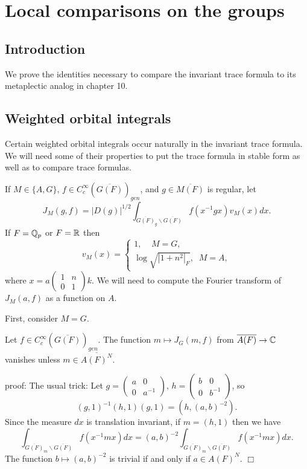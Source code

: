 
\chapter{Local comparisons on the groups}

\section{Introduction}
We prove the identities necessary to compare the
invariant trace formula to its metaplectic analog in chapter 10.

\section{Weighted orbital integrals}

Certain weighted orbital integrals occur naturally in the invariant trace
formula. We will need some of their properties to put the trace formula in
stable form as well as to compare trace formulas.  

If $M\in \{A,G\}$, $f\in C_c^\infty (\overline{G(F)})_{gen}$, and $g\in 
\overline{M(F)}$ is regular, let
\[
J_M(g,f)=|D(g)|^{1/2}
\int_{\overline{G(F)}_g\backslash \overline{G(F)}}
f(x^{-1}gx)v_M(x)dx.
\]
If $F={\Bbb{Q}}_p$ or $F={\Bbb{R}}$ then
\[
v_M(x)=\left\{ 
\begin{array}{c}
1,\;\;\;\;M=G, \\ 
\log \sqrt{|1+n^2|_F},\;\;M=A,
\end{array}
\right. 
\]
where $x=a\left( 
\begin{array}{cc}
1 & n \\ 
0 & 1
\end{array}
\right) k$. We will need to compute the Fourier transform of $J_M(a,f)$ as a
function on $A$.

First, consider $M=G$.

\begin{lemma}
Let $f\in C_c^\infty (\overline{G(F)})_{gen}$. The function $m\longmapsto
J_G(m,f)$ from $\overline{A(F)}\rightarrow {\Bbb C}$ vanishes unless $m\in 
\overline{A(F)^N}$.
\end{lemma}

proof: The usual trick: Let $g=\left( 
\begin{array}{cc}
a & 0 \\ 
0 & a^{-1}
\end{array}
\right) $, $h=\left( 
\begin{array}{cc}
b & 0 \\ 
0 & b^{-1}
\end{array}
\right) $, so
\[
(g,1)^{-1}(h,1)(g,1)=(h,(a,b)^{-2}).
\]
Since the measure $dx$ is translation invariant, if $m=(h,1)$ then we have
\[
\int_{\overline{G(F)}_m\backslash \overline{G(F)}}f(x^{-1}mx)dx=(a,b)^{-2}%
\int_{\overline{G(F)}_m\backslash \overline{G(F)}}f(x^{-1}mx)dx.
\]
The function $b\longmapsto (a,b)^{-2}$ is trivial if and only if $a\in A(F)^N
$. $\Box $


